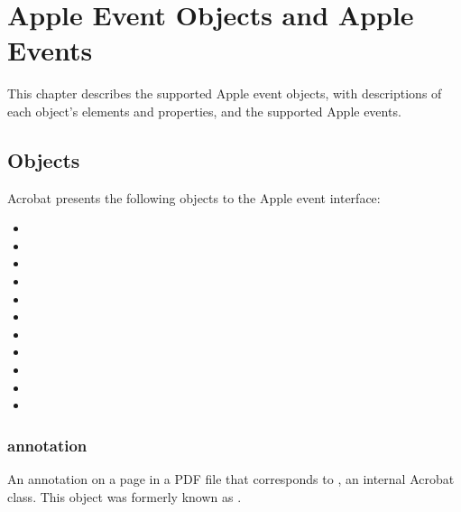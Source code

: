\documentclass[letterpaper,12pt,english,openany,oneside]{sphinxmanual}
\begin{document}
\chapter{Apple Event Objects and Apple Events}
\label{\detokenize{IAC_API_AppleEvtObjects:apple-event-objects-and-apple-events}}\label{\detokenize{IAC_API_AppleEvtObjects::doc}}
This chapter describes the supported Apple event objects, with descriptions of each object’s elements and properties, and the supported Apple events.


\section{Objects}
\label{\detokenize{IAC_API_AppleEvtObjects:objects}}
Acrobat presents the following objects to the Apple event interface:
\begin{itemize}
\item {} 

\item {} 

\item {} 

\item {} 

\item {} 

\item {} 

\item {} 

\item {} 

\item {} 

\item {} 

\item {} 

\end{itemize}




\subsection{annotation}
\label{\detokenize{IAC_API_AppleEvtObjects:annotation}}
An annotation on a page in a PDF file that corresponds to , an internal Acrobat class. This object was formerly known as .
\end{document}
